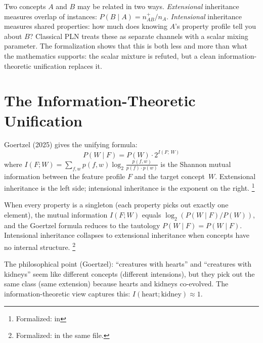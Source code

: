 \documentclass[11pt,openany]{report}
\begin{document}
Two concepts $A$ and $B$ may be related in two ways.
\emph{Extensional} inheritance measures overlap of instances:
$P(B \mid A) = n_{AB}^+ / n_A$.  \emph{Intensional} inheritance
measures shared properties: how much does knowing $A$'s property
profile tell you about $B$?  Classical PLN treats these as separate
channels with a scalar mixing parameter.  The formalization shows
that this is both less and more than what the mathematics supports:
the scalar mixture is refuted, but a clean information-theoretic
unification replaces it.


\section{The Information-Theoretic Unification}

Goertzel (2025) gives the unifying formula:
\[
  P(W \mid F) = P(W) \cdot 2^{I(F;\,W)}
\]
where $I(F; W) = \sum_{f,w} p(f,w) \log_2 \frac{p(f,w)}{p(f) \cdot
p(w)}$ is the Shannon mutual information between the feature profile
$F$ and the target concept~$W$.  Extensional inheritance is the left
side; intensional inheritance is the exponent on the right.%
\footnote{Formalized:
 in
}

\begin{theorem}
\label{thm:singleton-reduction}
When every property is a singleton (each property picks out exactly
one element), the mutual information $I(F; W)$ equals
$\log_2(P(W \mid F) / P(W))$, and the Goertzel formula reduces to
the tautology $P(W \mid F) = P(W \mid F)$.  Intensional inheritance
collapses to extensional inheritance when concepts have no internal
structure.%
\footnote{Formalized:  in the same file.}
\end{theorem}

\noindent
The philosophical point (Goertzel): ``creatures with hearts'' and
``creatures with kidneys'' seem like different concepts (different
intensions), but they pick out the same class (same extension)
because hearts and kidneys co-evolved.  The information-theoretic
view captures this: $I(\text{heart}; \text{kidney}) \approx 1$.

\end{document}
